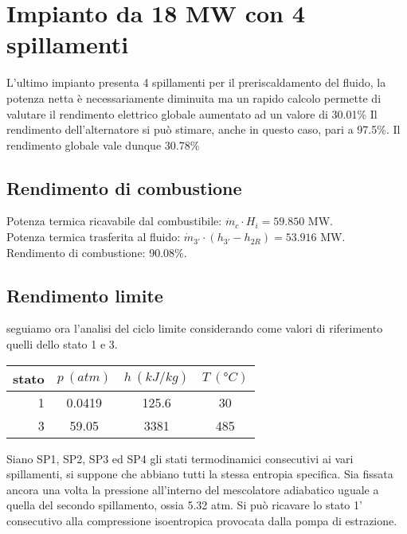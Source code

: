 \section{Impianto da 18 MW con 4 spillamenti}
L'ultimo impianto presenta 4 spillamenti per il preriscaldamento del fluido, la potenza netta è necessariamente diminuita
ma un rapido calcolo permette di valutare il rendimento elettrico globale aumentato ad un valore di 30.01\%
Il rendimento dell'alternatore si può stimare, anche in questo caso, pari a 97.5\%.
Il rendimento globale vale dunque 30.78\%

\subsection{Rendimento di combustione}
Potenza termica ricavabile dal combustibile: $\dot m_c \cdot H_i = 59.850$ MW.\\
Potenza termica trasferita al fluido: $\dot m_{3'} \cdot (h_{3'} - h_{2R}) = 53.916$ MW.\\
Rendimento di combustione: 90.08\%.

\subsection{Rendimento limite}
seguiamo ora l'analisi del ciclo limite considerando come valori di riferimento quelli dello stato 1 e 3.
\begin{center}
    \begin{tabular}{r|c|c|c}
        stato    & $p\ (atm)$ & $h\ (kJ/kg)$ & $T\ (\text{°}C) $\\ \hline
        1   &        0.0419 &          125.6   &           30     \\ \hline
        3   &        59.05  &           3381   &           485
    \end{tabular}
\end{center}
Siano SP1, SP2, SP3 ed SP4 gli stati termodinamici consecutivi ai vari spillamenti, si suppone che abbiano tutti la stessa entropia specifica.
Sia fissata ancora una volta la pressione all'interno del mescolatore adiabatico uguale a quella del secondo spillamento, ossia 5.32 atm.
Si può ricavare lo stato 1' consecutivo alla compressione isoentropica provocata dalla pompa di estrazione.

